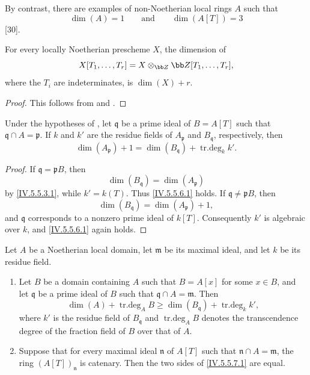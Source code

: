 By contrast, there are examples of non-Noetherian local rings $A$
such that
\[
\dim(A)=1
\qquad\text{and}\qquad
\dim(A[T])=3
\]
[30].

\begin{corollary}[5.5.5]
\label{IV.5.5.5}
For every locally Noetherian prescheme $X$, the dimension of
\[
X[T_1,\ldots,T_r]
  =X\otimes_{\bb Z}\bb Z[T_1,\ldots,T_r],
\]
where the $T_i$ are indeterminates, is $\dim(X)+r$.
\end{corollary}

\begin{proof}
This follows from  and .
\end{proof}

\begin{corollary}[5.5.6]
\label{IV.5.5.6}
Under the hypotheses of , let $\mathfrak q$ be a
prime ideal of $B=A[T]$ such that
$\mathfrak q\cap A=\mathfrak p$.
If $k$ and $k'$ are the residue fields of $A_{\mathfrak p}$ and
$B_{\mathfrak q}$, respectively, then
\begin{equation}
\dim(A_{\mathfrak p})+1
 =\dim(B_{\mathfrak q})+\operatorname{tr.deg}_k k'.
\tag{5.5.6.1}\label{IV.5.5.6.1}
\end{equation}
\end{corollary}

\begin{proof}

If $\mathfrak q=\mathfrak pB$, then
\[
\dim(B_{\mathfrak q})=\dim(A_{\mathfrak p})
\]
by \eqref{IV.5.5.3.1}, while $k'=k(T)$.
Thus \eqref{IV.5.5.6.1} holds.
If $\mathfrak q\neq\mathfrak pB$, then
\[
\dim(B_{\mathfrak q})=\dim(A_{\mathfrak p})+1,
\]
and $\mathfrak q$ corresponds to a nonzero prime ideal of $k[T]$.
Consequently $k'$ is algebraic over $k$, and
\eqref{IV.5.5.6.1} again holds.
\end{proof}

\begin{lemma}[5.5.7]
\label{IV.5.5.7}
Let $A$ be a Noetherian local domain, let $\mathfrak m$ be its
maximal ideal, and let $k$ be its residue field.
\begin{enumerate}[{\rm(i)}]
\item
{}
\label{IV.5.5.7.i}
Let $B$ be a domain containing $A$ such that $B=A[x]$ for some
$x\in B$, and let $\mathfrak q$ be a prime ideal of $B$ such that
$\mathfrak q\cap A=\mathfrak m$.
Then
\begin{equation}
\dim(A)+\operatorname{tr.deg}_A B
 \geq\dim(B_{\mathfrak q})+\operatorname{tr.deg}_k k',
\tag{5.5.7.1}\label{IV.5.5.7.1}
\end{equation}
where $k'$ is the residue field of $B_{\mathfrak q}$ and
$\operatorname{tr.deg}_A B$ denotes the transcendence degree of the
fraction field of $B$ over that of $A$.

\item
{}
\label{IV.5.5.7.ii}
Suppose that for every maximal ideal $\mathfrak n$ of $A[T]$ such
that $\mathfrak n\cap A=\mathfrak m$, the ring
$(A[T])_{\mathfrak n}$ is catenary.
Then the two sides of \eqref{IV.5.5.7.1} are equal.
\end{enumerate}
\end{lemma}

